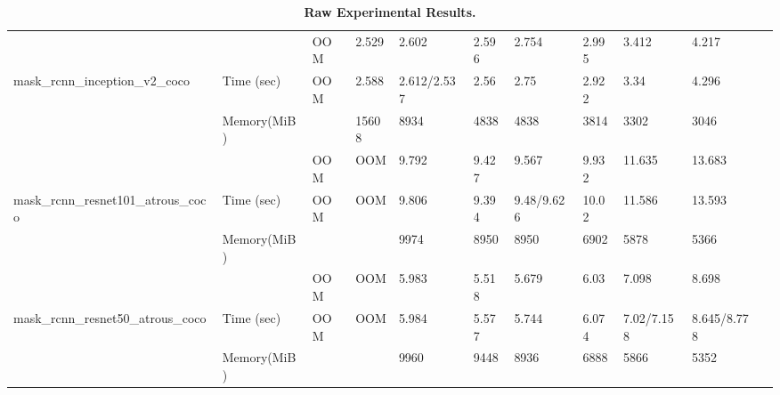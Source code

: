 \documentclass[conference]{IEEEtran}
\begin{document}
\begin{table}[]
{\begin{tabular}{lllllllllll}
                                                                &               & OOM                 & 2.529              & 2.602             & 2.596             & 2.754            & 2.995  & 3.412             & 4.217       &          \\
mask\_rcnn\_inception\_v2\_coco                                 & Time (sec)    & OOM                 & 2.588              & 2.612/2.537       & 2.56              & 2.75             & 2.922  & 3.34              & 4.296       &          \\
                                                                & Memory(MiB)   &                     & 15608              & 8934              & 4838              & 4838             & 3814   & 3302              & 3046        &          \\
                                                                &               & OOM                 & OOM                & 9.792             & 9.427             & 9.567            & 9.932  & 11.635            & 13.683      &          \\
mask\_rcnn\_resnet101\_atrous\_coco                             & Time (sec)    & OOM                 & OOM                & 9.806             & 9.394             & 9.48/9.626       & 10.02  & 11.586            & 13.593      &          \\
                                                                & Memory(MiB)   &                     &                    & 9974              & 8950              & 8950             & 6902   & 5878              & 5366        &          \\
                                                                &               & OOM                 & OOM                & 5.983             & 5.518             & 5.679            & 6.03   & 7.098             & 8.698       &          \\
mask\_rcnn\_resnet50\_atrous\_coco                              & Time (sec)    & OOM                 & OOM                & 5.984             & 5.577             & 5.744            & 6.074  & 7.02/7.158        & 8.645/8.778 &          \\
                                                                & Memory(MiB)   &                     &                    & 9960              & 9448              & 8936             & 6888   & 5866              & 5352        &         
\end{tabular}%
}
\caption{\textbf{Raw Experimental Results.}}
\label{table:raw-results}
\end{table}
\end{document}
